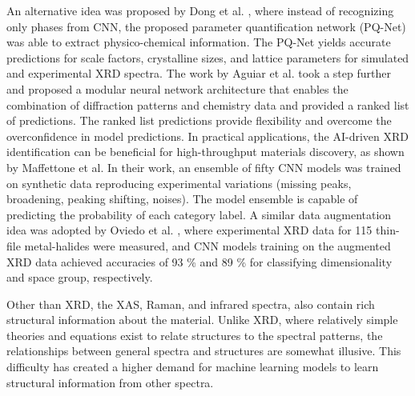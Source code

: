\documentclass[pdflatex,sn-mathphys]{sn-jnl}%
\theoremstyle{thmstyleone}%
\theoremstyle{thmstyletwo}%
\theoremstyle{thmstylethree}%
\begin{document}
An alternative idea was proposed by Dong et al. \cite{dongDeepConvolutionalNeural2021}, where instead of recognizing only phases from CNN, the proposed parameter quantification network (PQ-Net) was able to extract physico-chemical information. The PQ-Net yields accurate predictions for scale factors, crystalline sizes, and lattice parameters for simulated and experimental XRD spectra. The work by Aguiar et al. \cite{aguiarCrystallographicPredictionDiffraction2020} took a step further and proposed a modular neural network architecture that enables the combination of diffraction patterns and chemistry data and provided a ranked list of predictions. The ranked list predictions provide flexibility and overcome the overconfidence in model predictions. In practical applications, the AI-driven XRD identification can be beneficial for high-throughput materials discovery, as shown by Maffettone et al. \cite{maffettoneCrystallographyCompanionAgent2021a} In their work, an ensemble of fifty CNN models was trained on synthetic data reproducing experimental variations (missing peaks, broadening, peaking shifting, noises). The model ensemble is capable of predicting the probability of each category label. A similar data augmentation idea was adopted by Oviedo et al. \cite{oviedoFastInterpretableClassification2019}, where experimental XRD data for 115 thin-file metal-halides were measured, and CNN models training on the augmented XRD data achieved accuracies of 93 \% and 89 \% for classifying dimensionality and space group, respectively. 

Other than XRD, the XAS, Raman, and infrared spectra, also contain rich structural information about the material. Unlike XRD, where relatively simple theories and equations exist to relate structures to the spectral patterns, the relationships between general spectra and structures are somewhat illusive. This difficulty has created a higher demand for machine learning models to learn structural information from other spectra.  
\end{document}
